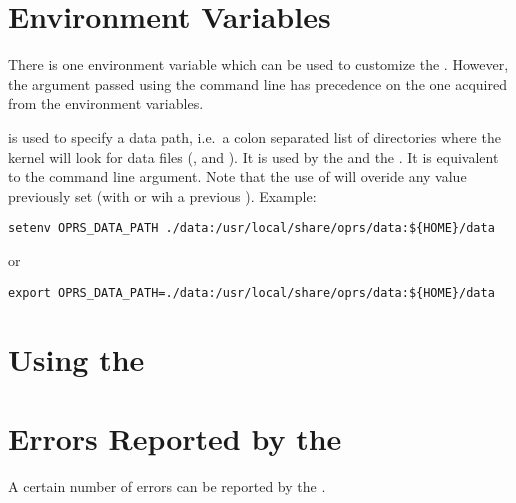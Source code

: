 \section{\OPC{} Environment Variables}

There is one environment variable which can be used to customize the \OPC{}.
However, the argument passed using the command line has precedence on the one
acquired from the environment variables.

\begin{description}


\item[\code{OPRS\_DATA\_PATH}] is used  to specify a data path, i.e.\ a colon separated
list of directories where the kernel will look for data files (,
 and ). It is used by the \CPK{} and the \XPK{}. It is
equivalent to the  command line argument. Note that the use of
 will overide any value previously set (with  
or wih a previous ).\*
Example:
\begin{verbatim}
setenv OPRS_DATA_PATH ./data:/usr/local/share/oprs/data:${HOME}/data
\end{verbatim}
or
\begin{verbatim}
export OPRS_DATA_PATH=./data:/usr/local/share/oprs/data:${HOME}/data
\end{verbatim}

\end{description}

\section{Using the \OPC{}}

\section{Errors Reported by the \OPC{}}

A certain number of errors can be reported by the \OPC{}.

